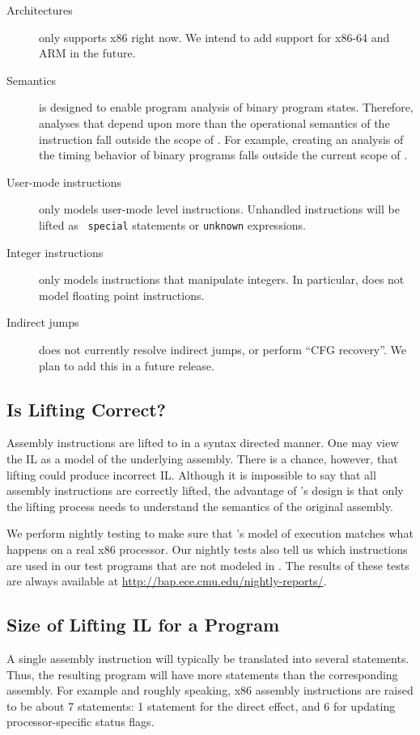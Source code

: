 \begin{description}
\item[Architectures] \bap only supports x86 right now.  We intend to
  add support for x86-64 and ARM in the future.
\item[Semantics] \bap is designed to enable program analysis of binary
  program states. Therefore, analyses that depend upon more than the
  operational semantics of the instruction fall outside the scope of
  \bap. For example, creating an analysis of the timing behavior of
  binary programs falls outside the current scope of \bap.
\item[User-mode instructions] \bap only models user-mode level
  instructions.  Unhandled instructions will be lifted as {\tt
    special} statements or {\tt unknown} expressions.
\item[Integer instructions] \bap only models instructions that
  manipulate integers.  In particular, \bap does not model floating
  point instructions.
\item[Indirect jumps] \bap does not currently resolve indirect jumps,
  or perform ``CFG recovery''.  We plan to add this in a future
  release.
\end{description}

\subsection{Is Lifting Correct?}

Assembly instructions are lifted to \bap in a syntax directed manner.
One may view the \bap IL as a model of the underlying assembly.  There
is a chance, however, that lifting could produce incorrect
IL. Although it is impossible to say that all assembly instructions
are correctly lifted, the advantage of \bap's design is that only the
lifting process needs to understand the semantics of the original
assembly.

We perform nightly testing to make sure that \bap's model of execution
matches what happens on a real x86 processor.  Our nightly tests also
tell us which instructions are used in our test programs that are not
modeled in \bap.  The results of these tests are always available at
\url{http://bap.ece.cmu.edu/nightly-reports/}.

\subsection{Size of Lifting IL for a Program}

A single assembly instruction will typically be translated into
several \bap statements. Thus, the resulting \bap program will have
more statements than the corresponding assembly.  For example and
roughly speaking, x86 assembly instructions are raised to be about 7
\bap statements: 1 \bap statement for the direct effect, and 6 for
updating processor-specific status flags.

